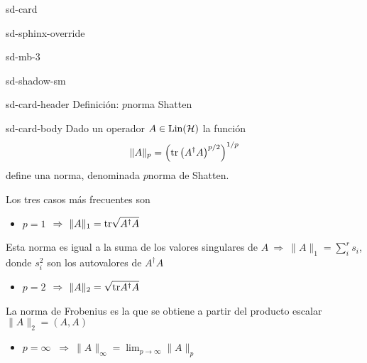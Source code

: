 \documentclass[letterpaper,10pt,english]{jupyterBook}
\newcommand{\Hil}{{\cal H}}
\newcommand{\Lin}{\hbox{Lin}}
\begin{document}
\sphinxAtStartPar


\begin{sphinxuseclass}{sd-card}
\begin{sphinxuseclass}{sd-sphinx-override}
\begin{sphinxuseclass}{sd-mb-3}
\begin{sphinxuseclass}{sd-shadow-sm}
\begin{sphinxuseclass}{sd-card-header}
\sphinxAtStartPar
Definición: \(p\)\sphinxhyphen{}norma Shatten

\end{sphinxuseclass}
\begin{sphinxuseclass}{sd-card-body}
\sphinxAtStartPar
Dado un operador \(A\in \Lin(\Hil)\) la función
\begin{equation*}
\begin{split}
\| A \|_p =  \left({\rm tr} \left(A^\dagger A\right)^{p/2} \right)^{1/p}
\end{split}
\end{equation*}
\sphinxAtStartPar
define una norma, denominada \(p\)\sphinxhyphen{}norma de Shatten.

\end{sphinxuseclass}
\end{sphinxuseclass}
\end{sphinxuseclass}
\end{sphinxuseclass}
\end{sphinxuseclass}
\sphinxAtStartPar
Los tres casos más frecuentes son
\begin{itemize}
\item {} 
\sphinxAtStartPar
\(p=1\)  \(~\Rightarrow ~  \| A \|_1 =  {\rm tr} \sqrt{A^\dagger A}\)

\end{itemize}

\sphinxAtStartPar
Esta norma es igual a la suma de los valores singulares de \(A ~\Rightarrow ~\| A \|_1  = \sum_i^r s_i\), donde \(s_i^2\) son los autovalores de \(A^\dagger A\)
\begin{itemize}
\item {} 
\sphinxAtStartPar
\(p=2\)  \(~\Rightarrow ~ \| A \|_2 =  \sqrt{{ \rm tr} A^\dagger A }\)

\end{itemize}

\sphinxAtStartPar
La norma de Frobenius es la que se obtiene a partir  del producto escalar \(\|A\|_2 = (A,A)\)
\begin{itemize}
\item {} 
\sphinxAtStartPar
\(p=\infty\)  \(~\Rightarrow ~  \| A \|_\infty = \lim_{p\to \infty} \| A \|_p\)

\end{itemize}
\end{document}
